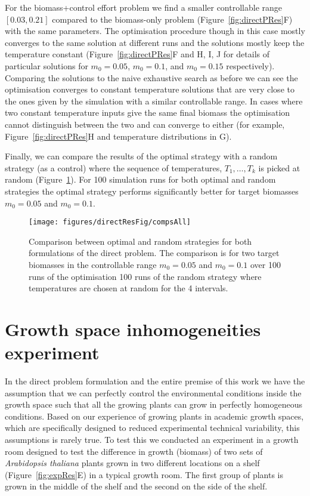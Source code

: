 \documentclass[phd]{infthesis}
\begin{document}
For the biomass+control effort problem we find a smaller controllable range
$[0.03, 0.21]$ compared to the biomass-only problem
(Figure~\ref{fig:directPRes}F) with the same parameters. The optimisation
procedure though in this case mostly converges to the same solution at different
runs and the solutions mostly keep the temperature constant
(Figure~\ref{fig:directPRes}F and H, I, J for details of particular solutions
for $m_0=0.05$, $m_0=0.1$, and $m_0=0.15$ respectively). Comparing the solutions
to the naive exhaustive search as before we can see the optimisation converges
to constant temperature solutions that are very close to the ones given by the
simulation with a similar controllable range. In cases where two constant
temperature inputs give the same final biomass the optimisation cannot
distinguish between the two and can converge to either (for example,
Figure~\ref{fig:directPRes}H and temperature distributions in G).

Finally, we can compare the results of the optimal strategy with a random
strategy (as a control) where the sequence of temperatures, $T_1, \dots, T_k$ is
picked at random (Figure~\ref{fig:compsAllDir}). For 100 simulation runs for
both optimal and random strategies the optimal strategy performs significantly
better for target biomasses $m_0=0.05$ and $m_0=0.1$.

\begin{figure}
\centering
\texttt{[image: figures/directResFig/compsAll]}
\caption{
  Comparison between optimal and random strategies for both formulations of the
  direct problem. The comparison is for two target biomasses in the controllable
  range $m_0=0.05$ and $m_0=0.1$ over 100 runs of the optimisation 100 runs of
  the random strategy where temperatures are chosen at random for the 4
  intervals.
}
\label{fig:compsAllDir}
\end{figure}


\section{Growth space inhomogeneities experiment}
\label{sec:exp}
In the direct problem formulation and the entire premise of this work we have
the assumption that we can perfectly control the environmental conditions inside
the growth space such that all the growing plants can grow in perfectly
homogeneous conditions. Based on our experience of growing plants in academic
growth spaces, which are specifically designed to reduced experimental technical
variability, this assumptions is rarely true. To test this we conducted an
experiment in a growth room designed to test the difference in growth (biomass)
of two sets of \textit{Arabidopsis thaliana} plants grown in two different
locations on a shelf (Figure~\ref{fig:expRes}E) in a typical growth room. The
first group of plants is grown in the middle of the shelf and the second on the
side of the shelf.
\end{document}
